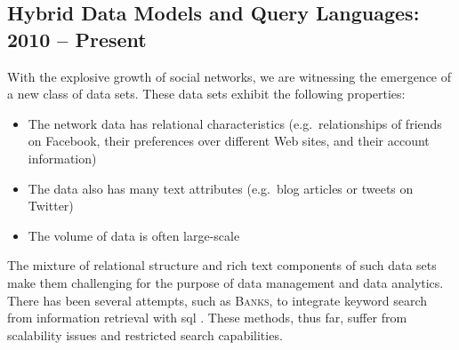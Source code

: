 	\subsection{Hybrid Data Models and Query Languages: 2010 -- Present}
		With the explosive growth of social networks, we are witnessing the emergence of a new class of data sets.  These data sets exhibit the following properties:
		
		\begin{itemize}
			\item The network data has relational characteristics (e.g.~relationships of friends on Facebook, their preferences over different Web sites, and their account information)
			\item The data also has many text attributes (e.g.~blog articles or tweets on Twitter)
			\item The volume of data is often large-scale
		\end{itemize}
		
		The mixture of relational structure and rich text components of such data sets make them challenging for the purpose of data management and data analytics.  There has been several attempts, such as \textsc{Banks}, to integrate keyword search from information retrieval with \gls{sql} \cite{banks-02, fuzzy-11, ir-03}.  These methods, thus far, suffer from scalability issues and restricted search capabilities.